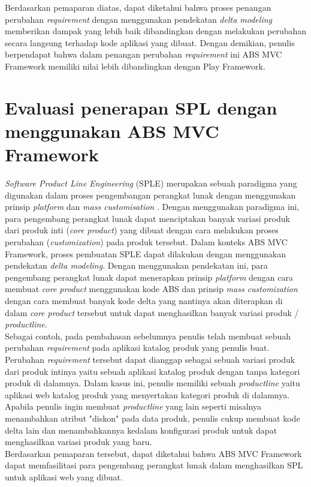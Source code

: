 Berdasarkan pemaparan diatas, dapat diketahui bahwa proses penangan perubahan \textit{requirement} dengan menggunakan pendekatan \textit{delta modeling} memberikan dampak yang lebih baik dibandingkan dengan melakukan perubahan secara langsung terhadap kode aplikasi yang dibuat. Dengan demikian, penulis berpendapat bahwa dalam penangan perubahan \textit{requirement} ini ABS MVC Framework memiliki nilai lebih dibandingkan dengan Play Framework.

\section{Evaluasi penerapan SPL dengan menggunakan ABS MVC Framework}

\textit{Software Product Line Engineering} (SPLE) merupakan sebuah paradigma yang digunakan dalam proses pengembangan perangkat lunak dengan menggunakan prinsip \textit{platform} dan \textit{mass customisation} \citep[p.~14]{pohl2005software}. Dengan menggunakan paradigma ini, para pengembang perangkat lunak dapat menciptakan banyak variasi produk dari produk inti (\textit{core product}) yang dibuat dengan cara melakukan proses perubahan (\textit{customization}) pada produk tersebut. Dalam konteks ABS MVC Framework, proses pembuatan SPLE dapat dilakukan dengan menggunakan pendekatan \textit{delta modeling}. Dengan menggunakan pendekatan ini, para pengembang perangkat lunak dapat menerapkan prinsip \textit{platform} dengan cara membuat \textit{core product} menggunakan kode ABS dan prinsip \textit{mass customization} dengan cara membuat banyak kode delta yang nantinya akan diterapkan di dalam \textit{core product} tersebut untuk dapat menghasilkan banyak variasi produk / \textit{productline}.\\

Sebagai contoh, pada pembahasan sebelumnya penulis telah membuat sebuah perubahan \textit{requirement} pada aplikasi katalog produk yang penulis buat. Perubahan \textit{requirement} tersebut dapat dianggap sebagai sebuah variasi produk dari produk intinya yaitu sebuah aplikasi katalog produk dengan tanpa kategori produk di dalamnya. Dalam kasus ini, penulis memiliki sebuah \textit{productline} yaitu aplikasi web katalog produk yang menyertakan kategori produk di dalamnya. Apabila penulis ingin membuat \textit{productline} yang lain seperti misalnya menambahkan atribut "diskon" pada data produk, penulis cukup membuat kode delta lain dan menambahkannya kedalam konfigurasi produk untuk dapat menghasilkan variasi produk yang baru.\\

Berdasarkan pemaparan tersebut, dapat diketahui bahwa ABS MVC Framework dapat memfasilitasi para pengembang perangkat lunak dalam menghasilkan SPL untuk aplikasi web yang dibuat.
